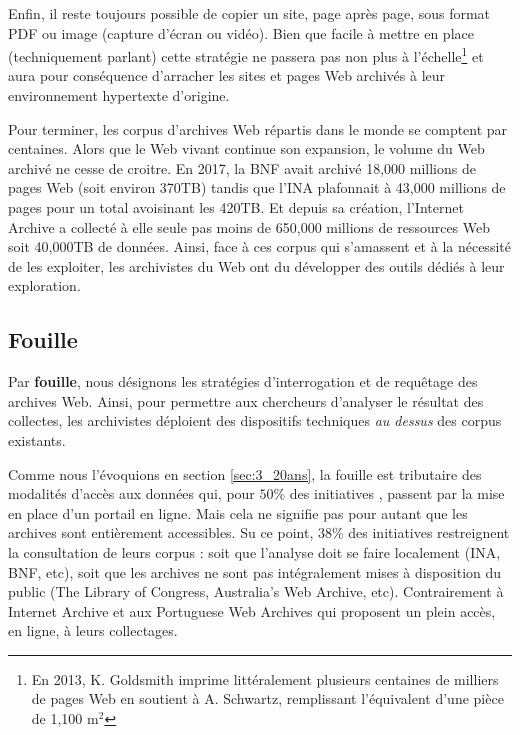 \documentclass[symmetric,justified,marginals=raggedouter]{tufte-book}
\begin{document}
Enfin, il reste toujours possible de copier un site, page après page, sous format PDF ou image (capture d'écran ou vidéo). Bien que facile à mettre en place (techniquement parlant) cette stratégie ne passera pas non plus à l'échelle\footnote{En 2013, K. Goldsmith imprime littéralement plusieurs centaines de milliers de pages Web en soutient à A. Schwartz, remplissant l'équivalent d'une pièce de 1,100 $\mathrm{m}^2$} et aura pour conséquence d'arracher les sites et pages Web archivés à leur environnement hypertexte d'origine.  

Pour terminer, les corpus d'archives Web répartis dans le monde se comptent par centaines. Alors que le Web vivant continue son expansion, le volume du Web archivé ne cesse de croitre. En 2017, la BNF avait archivé 18,000 millions de pages Web (soit environ 370TB) tandis que l'INA plafonnait à 43,000 millions de pages pour un total avoisinant les 420TB. Et depuis sa création, l'Internet Archive a collecté à elle seule pas moins de 650,000 millions de ressources Web soit 40,000TB de données. Ainsi, face à ces corpus qui s'amassent et à la nécessité de les exploiter, les archivistes du Web ont du développer des outils dédiés à leur exploration.

\subsection{Fouille}

\noindent Par \textbf{fouille}, nous désignons les stratégies d'interrogation et de requêtage des archives Web. Ainsi, pour permettre aux chercheurs d'ana\-lyser le résultat des collectes, les archivistes déploient des dispositifs techniques \textit{au dessus} des corpus existants. 

Comme nous l'évoquions en section \ref{sec:3_20ans}, la fouille est tributaire des modalités d'accès aux données qui, pour $50\%$ des initiatives \citep{costa_survey_2013}, passent par la mise en place d'un portail en ligne. Mais cela ne signifie pas pour autant que les archives sont entièrement accessibles. Su ce point, $38\%$ des initiatives restreignent la consultation de leurs corpus : soit que l'analyse doit se faire localement (INA, BNF, etc), soit que les archives ne sont pas intégralement mises à disposition du public (The Library of Congress, Australia's Web Archive, etc). Contrairement à Internet Archive et aux Portuguese Web Archives qui proposent un plein accès, en ligne, à leurs collectages.  
\end{document}
